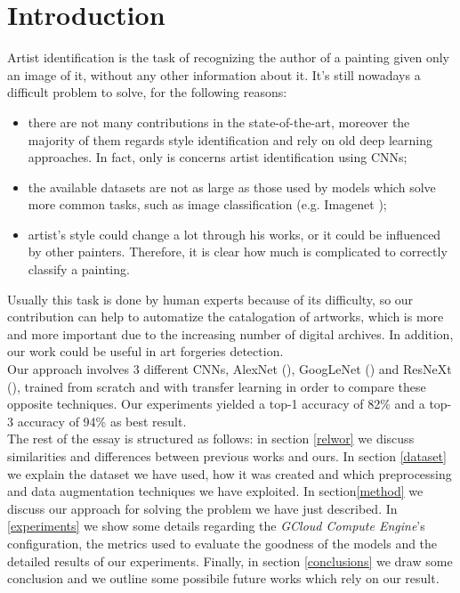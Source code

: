 \documentclass{article}
\begin{document}
\section{Introduction}
Artist identification is the task of recognizing the author of a painting given only an image of it, without any other information about it. It's still nowadays a difficult problem to solve, for the following reasons:
\begin{itemize}
	\item there are not many contributions in the state-of-the-art, moreover the majority of them regards style identification and rely on old deep learning approaches. In fact, only \cite{ArtistIdCNN406} is concerns artist identification using CNNs;
	\item the available datasets are not as large as those used by models which solve more common tasks, such as image classification (e.g. Imagenet \cite{imagenet});
	\item artist's style could change a lot through his works, or it could be influenced by other painters. Therefore, it is clear how much is complicated to correctly classify a painting. 
\end{itemize}
Usually this task is done by human experts because of its difficulty, so our contribution can help to automatize the catalogation of artworks, which is more and more important due to the increasing number of  digital archives. In addition, our work could be useful in art forgeries detection.\\
Our approach involves 3 different CNNs, AlexNet (\cite{alexnet}), GoogLeNet (\cite{googlenet}) and ResNeXt (\cite{resneXt}), trained from scratch and with transfer learning in order to compare these opposite techniques. Our experiments yielded a top-1 accuracy of 82\%  and a top-3 accuracy of 94\% as best result.\\


The rest of the essay is structured as follows: in section \ref{relwor} we discuss  similarities and differences between previous works and ours. In section \ref{dataset} we explain the dataset we have used, how it was created and which preprocessing and data augmentation techniques we have exploited. In section\ref{method}
we discuss our approach for solving the problem we have just described. In \ref{experiments} we show some details regarding the \textit{GCloud Compute Engine}'s configuration, the metrics used to evaluate the goodness of the models and the detailed results of our experiments. Finally, in section \ref{conclusions} we draw some conclusion and we outline some possibile future works which rely on our result.
\end{document}
